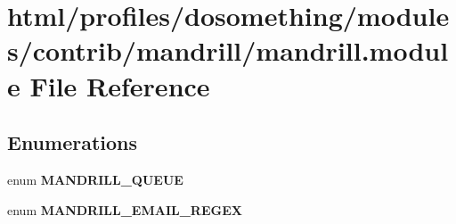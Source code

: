 \hypertarget{mandrill_8module}{
\section{html/profiles/dosomething/modules/contrib/mandrill/mandrill.module File Reference}
\label{mandrill_8module}
}
\subsection*{Enumerations}
\begin{DoxyCompactItemize}
\item 
enum {\bfseries MANDRILL\_\-QUEUE} 
\item 
enum {\bfseries MANDRILL\_\-EMAIL\_\-REGEX} 
\end{DoxyCompactItemize}
